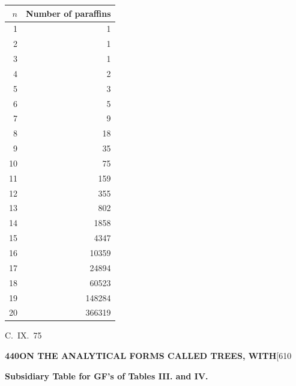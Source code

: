 \documentclass[11pt,a4paper]{book}
\begin{document}
{\begin{center}
\begin{tabular}{|r|r|}
\hline
$n$ & Number of paraffins \\
\hline
1 & 1 \\
2 & 1 \\
3 & 1 \\
4 & 2 \\
5 & 3 \\
6 & 5 \\
7 & 9 \\
8 & 18 \\
9 & 35 \\
10 & 75 \\
11 & 159 \\
12 & 355 \\
13 & 802 \\
14 & 1858 \\
15 & 4347 \\
16 & 10359 \\
17 & 24894 \\
18 & 60523 \\
19 & 148284 \\
20 & 366319 \\
\hline
\end{tabular}
\end{center}
\hfill C.~IX.\ 75

\newpage
\noindent\textbf{440}\hspace{\fill}\textbf{ON THE ANALYTICAL FORMS CALLED TREES, WITH}\hspace{\fill}[610

\noindent\textbf{Subsidiary Table for GF's of Tables III. and IV.}

}
\end{document}
